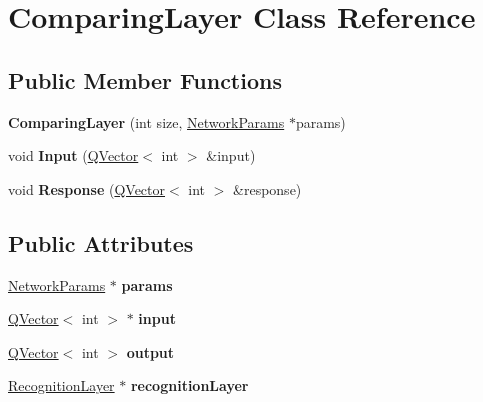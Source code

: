 \hypertarget{class_comparing_layer}{}\section{Comparing\+Layer Class Reference}
\label{class_comparing_layer}
\subsection*{Public Member Functions}
\begin{DoxyCompactItemize}
\item 
\mbox{\label{class_comparing_layer_ae9e621952f79718c948f31a9569804da}} 
{\bfseries Comparing\+Layer} (int size, \hyperlink{struct_a_r_t_1_1_network_params}{Network\+Params} $\ast$params)
\item 
\mbox{\label{class_comparing_layer_a85b9d3ff04a58d2159226e760b9607d0}} 
void {\bfseries Input} (\hyperlink{class_q_vector}{Q\+Vector}$<$ int $>$ \&input)
\item 
\mbox{\label{class_comparing_layer_a7fd6674cdb61903b3ad9428cafcc1c09}} 
void {\bfseries Response} (\hyperlink{class_q_vector}{Q\+Vector}$<$ int $>$ \&response)
\end{DoxyCompactItemize}
\subsection*{Public Attributes}
\begin{DoxyCompactItemize}
\item 
\mbox{\label{class_comparing_layer_a2c69b1c07b6cdf6ff5230680776bcb71}} 
\hyperlink{struct_a_r_t_1_1_network_params}{Network\+Params} $\ast$ {\bfseries params}
\item 
\mbox{\label{class_comparing_layer_ac530a1f5b25253d54cc6ee7331d6cc4f}} 
\hyperlink{class_q_vector}{Q\+Vector}$<$ int $>$ $\ast$ {\bfseries input}
\item 
\mbox{\label{class_comparing_layer_af224db952c3b4562e4f9e758369a53f8}} 
\hyperlink{class_q_vector}{Q\+Vector}$<$ int $>$ {\bfseries output}
\item 
\mbox{\label{class_comparing_layer_a76b454e89f511095e167fd7352595e9b}} 
\hyperlink{class_recognition_layer}{Recognition\+Layer} $\ast$ {\bfseries recognition\+Layer}
\end{DoxyCompactItemize}
